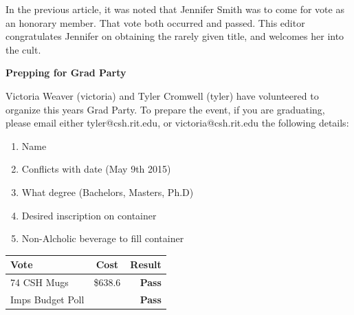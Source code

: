 \documentclass[9pt]{extarticle} %
\begin{document}
\begin{minipage}[t]{.30\linewidth}
\begin{mdframed}[style=sidebar,frametitle={}]
In the previous article, it was noted that Jennifer Smith was to come for vote as an honorary member. That vote both occurred and passed. This editor congratulates Jennifer on obtaining the rarely given title, and welcomes her into the cult.

\textbf{Prepping for Grad Party}

Victoria Weaver (victoria) and Tyler Cromwell (tyler) have volunteered to organize this years Grad Party. To prepare the event, if you are graduating, please email either tyler@csh.rit.edu, or victoria@csh.rit.edu the following details:
\begin{enumerate}[leftmargin=*]
\item{Name}
\item{Conflicts with date (May 9th 2015)}
\item{What degree (Bachelors, Masters, Ph.D)}
\item{Desired inscription on container}
\item{Non-Alcholic beverage to fill container}
\end{enumerate}


\begin{tabular}{lcr}

Vote & Cost & Result \\
\midrule
74 CSH  Mugs & \$638.6 & \textbf{Pass} \\
Imps Budget Poll & & \textbf{Pass} \\
\bottomrule
\end{tabular}


\end{mdframed}
\end{minipage}\hfill %
%
%
\end{document}
